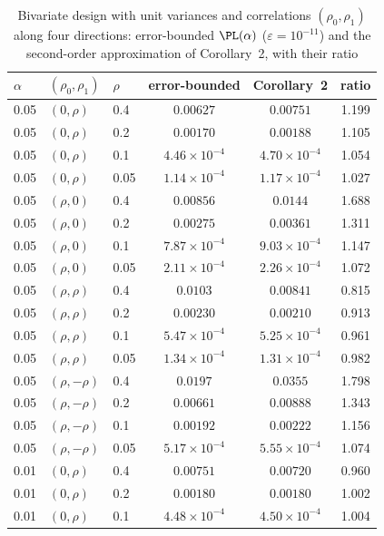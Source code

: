 \begin{table}[t]
\caption{Bivariate design with unit variances and correlations $(\rho_0,\rho_1)$ along four directions: error-bounded $\PL(\alpha)$ ($\varepsilon=10^{-11}$) and the second-order approximation of Corollary~2, with their ratio}\label{tab:weakbiv}
\footnotesize
\begin{tabular*}{\textwidth}{@{\extracolsep\fill}lllccc@{}}
\toprule
$\alpha$ & $(\rho_0,\rho_1)$ & $\rho$ & error-bounded & Corollary~2 & ratio\\
\midrule
0.05 & $(0,\rho)$ & 0.4 & $0.00627$ & $0.00751$ & 1.199\\
0.05 & $(0,\rho)$ & 0.2 & $0.00170$ & $0.00188$ & 1.105\\
0.05 & $(0,\rho)$ & 0.1 & $4.46\times10^{-4}$ & $4.70\times10^{-4}$ & 1.054\\
0.05 & $(0,\rho)$ & 0.05 & $1.14\times10^{-4}$ & $1.17\times10^{-4}$ & 1.027\\
0.05 & $(\rho,0)$ & 0.4 & $0.00856$ & $0.0144$ & 1.688\\
0.05 & $(\rho,0)$ & 0.2 & $0.00275$ & $0.00361$ & 1.311\\
0.05 & $(\rho,0)$ & 0.1 & $7.87\times10^{-4}$ & $9.03\times10^{-4}$ & 1.147\\
0.05 & $(\rho,0)$ & 0.05 & $2.11\times10^{-4}$ & $2.26\times10^{-4}$ & 1.072\\
0.05 & $(\rho,\rho)$ & 0.4 & $0.0103$ & $0.00841$ & 0.815\\
0.05 & $(\rho,\rho)$ & 0.2 & $0.00230$ & $0.00210$ & 0.913\\
0.05 & $(\rho,\rho)$ & 0.1 & $5.47\times10^{-4}$ & $5.25\times10^{-4}$ & 0.961\\
0.05 & $(\rho,\rho)$ & 0.05 & $1.34\times10^{-4}$ & $1.31\times10^{-4}$ & 0.982\\
0.05 & $(\rho,-\rho)$ & 0.4 & $0.0197$ & $0.0355$ & 1.798\\
0.05 & $(\rho,-\rho)$ & 0.2 & $0.00661$ & $0.00888$ & 1.343\\
0.05 & $(\rho,-\rho)$ & 0.1 & $0.00192$ & $0.00222$ & 1.156\\
0.05 & $(\rho,-\rho)$ & 0.05 & $5.17\times10^{-4}$ & $5.55\times10^{-4}$ & 1.074\\
\midrule
0.01 & $(0,\rho)$ & 0.4 & $0.00751$ & $0.00720$ & 0.960\\
0.01 & $(0,\rho)$ & 0.2 & $0.00180$ & $0.00180$ & 1.002\\
0.01 & $(0,\rho)$ & 0.1 & $4.48\times10^{-4}$ & $4.50\times10^{-4}$ & 1.004\\

\end{tabular*}
\end{table}

